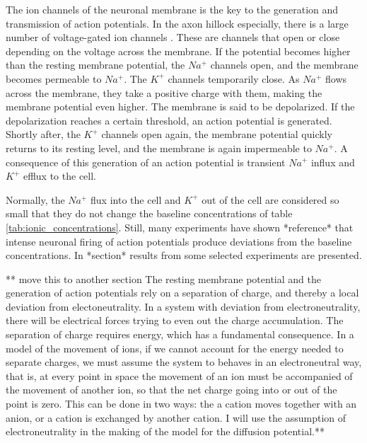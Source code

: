 \documentclass{article}
\begin{document}
The ion channels of the neuronal membrane is the key to the generation and transmission of action potentials. In the axon hillock especially, there is a large number of voltage-gated ion channels \cite{newworldencyclopedia}. These are channels that open or close depending on the voltage across the membrane. If the potential becomes higher than the resting membrane potential, the $Na^+$ channels open, and the membrane becomes permeable to $Na^+$. The $K^+$ channels temporarily close. As $Na^+$ flows across the membrane, they take a positive charge with them, making the membrane potential even higher. The membrane is said to be depolarized. If the depolarization reaches a certain threshold, an action potential is generated. Shortly after, the $K^+$ channels open again, the membrane potential quickly returns to its resting level, and the membrane is again impermeable to $Na^+$. A consequence of this generation of an action potential is transient $Na^+$ influx and $K^+$ efflux to the cell. 


Normally, the $Na^+$ flux into the cell and $K^+$ out of the cell are considered so small that they do not change the baseline concentrations of table \ref{tab:ionic_concentrations}. Still, many experiments have shown *reference* that intense neuronal firing of action potentials produce deviations from the baseline concentrations. In *section* results from some selected experiments are presented.

** move this to  another section
The resting membrane potential and the generation of action potentials rely on a separation of charge, and thereby a local deviation from electoneutrality. In a system with deviation from electroneutrality, there will be electrical forces trying to even out the charge accumulation. The separation of charge requires energy, which has a fundamental consequence. In a model of the movement of ions, if we cannot account for the energy needed to separate charges, we must assume the system to behaves in an electroneutral way, that is, at every point in space the movement of an ion must be accompanied of the movement of another ion, so that the net charge going into or out of the point is zero. This can be done in two ways: the a cation moves together with an anion, or a cation is exchanged by another cation. I will use the assumption of electroneutrality in the making of the model for the diffusion potential.**
\end{document}
